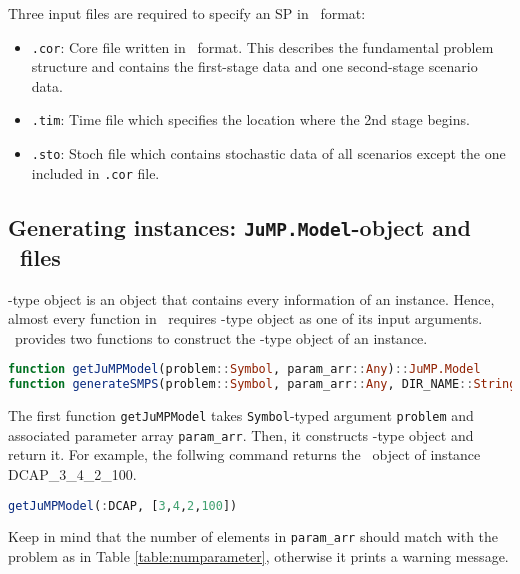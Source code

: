 Three input files are required to specify an SP in \smps\ format:
\begin{itemize}
	\item \texttt{.cor}: Core file written in \mps\ format. This describes the fundamental problem structure and contains the first-stage data and one second-stage scenario data.
	\item \texttt{.tim}: Time file which specifies the location where the 2nd stage begins.
	\item \texttt{.sto}: Stoch file which contains stochastic data of all scenarios except the one included in \texttt{.cor} file.
\end{itemize}


\subsection{Generating instances: \texttt{JuMP.Model}-object and \smps\ files}
\jumpmodel-type object is an object that contains every information of an instance. Hence, almost every function in \siplibjl\ requires \jumpmodel-type object as one of its input arguments. \siplibjl\ provides two functions to construct the \jumpmodel-type object of an instance.
\begin{lstlisting}[frame=single,language=julia]
function getJuMPModel(problem::Symbol, param_arr::Any)::JuMP.Model
function generateSMPS(problem::Symbol, param_arr::Any, DIR_NAME::String="$(dirname(@__FILE__))/../instance")::JuMP.Model
\end{lstlisting}

The first function \texttt{getJuMPModel} takes \texttt{Symbol}-typed argument \texttt{problem} and associated parameter array \texttt{param\_arr}. Then, it constructs \jumpmodel-type object and return it. For example, the follwing command returns the \jumpmodel\ object of instance DCAP\_3\_4\_2\_100.
\begin{lstlisting}[frame=single,language=julia]
getJuMPModel(:DCAP, [3,4,2,100])
\end{lstlisting}
Keep in mind that the number of elements in \texttt{param\_arr} should match with the problem as in Table \ref{table:numparameter}, otherwise it prints a warning message.

